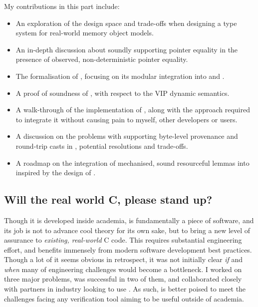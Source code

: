 My contributions in this part include:
\begin{itemize}
    \item An exploration of the design space and trade-offs when designing a
        type system for real-world memory object models.
    \item An in-depth discussion about soundly supporting pointer equality in
        the presence of observed, non-deterministic pointer equality.
    \item The formalisation of , focusing on its modular integration into
         and .
    \item A proof of soundness of , with respect to the VIP dynamic semantics.
    \item A walk-through of the implementation of , along with the
        approach required to integrate it without causing pain to myself, other
        developers or users.
    \item A discussion on the problems with supporting byte-level provenance
        and round-trip casts in , potential resolutions and trade-offs.
    \item A roadmap on the integration of mechanised, sound resourceful lemmas
        into  inspired by the design of .
\end{itemize}

\subsection{Will the real world C, please stand up?}

Though it is developed inside academia,  is fundamentally a piece of
software, and its job is not to advance cool theory for its own sake, but to
bring a new level of assurance to \emph{existing, real-world}  C
code. This requires substantial engineering effort, and benefits immensely from
modern software development best practices. Though a lot of it seems obvious in
retrospect, it was not initially clear \emph{if} and \emph{when} many of
engineering challenges would become a bottleneck. I worked on three major
problems, was successful in two of them, and collaborated closely with partners
in industry looking to use . As such,  is better poised to meet
the challenges facing any verification tool aiming to be useful outside of
academia.

